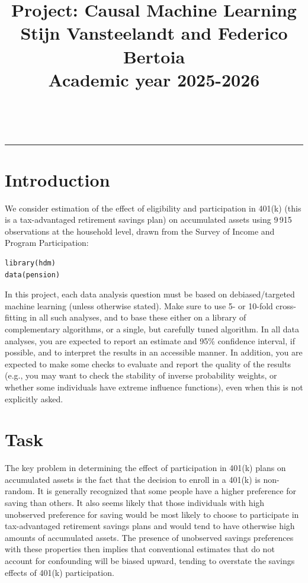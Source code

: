 \documentclass[11pt,fleqn]{article}
\begin{document}
\title{\vspace*{-2.5cm} {\LARGE {\bf Project: Causal Machine Learning}} \\[1ex]
Stijn Vansteelandt and Federico Bertoia\\[1ex]
Academic year 2025-2026}
\date{}
\maketitle

\vspace*{-1.5cm}\\
\hrule
\vspace*{0.5cm}

\section{Introduction}

We consider estimation of the effect of eligibility and participation in 401(k) (this is a tax-advantaged retirement savings plan) on accumulated assets using 9\,915 observations at the household level, drawn from the Survey of Income and Program Participation:
\begin{verbatim}
library(hdm)
data(pension)
\end{verbatim}
In this project, each data analysis question must be based on debiased/targeted machine learning (unless otherwise stated). Make sure to use 5- or 10-fold cross-fitting in all such analyses, and to base these either on a library of complementary algorithms, or a single, but carefully tuned algorithm. In all data analyses, you are expected to report an estimate and 95\% confidence interval, if possible, and to interpret the results in an accessible manner. In addition, you are expected to make some checks to evaluate and report the quality of the results (e.g., you may want to check the stability of inverse probability weights, or whether some individuals have extreme influence functions), even when this is not explicitly asked.

\section{Task}

The key problem in determining the effect of participation in 401(k) plans on accumulated assets is the fact that the decision to enroll in a 401(k) is non-random. It is generally recognized that some people have a higher preference for saving than others. It also seems likely that those individuals with high unobserved preference for saving would be most likely to choose to participate in tax-advantaged retirement savings plans and would tend to have otherwise high amounts of accumulated assets. The presence of unobserved savings preferences with these properties then implies that conventional estimates that do not account for confounding will be biased upward, tending to overstate the savings effects of 401(k) participation. 
\end{document}
